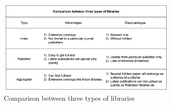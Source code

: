 \begin{figure}[htb]
	\begin{center}
		\includegraphics[width=0.8\textwidth]{WolverineChart3}
	\end{center}
	\caption{Comparison between three types of libraries}
\end{figure}
\clearpage
